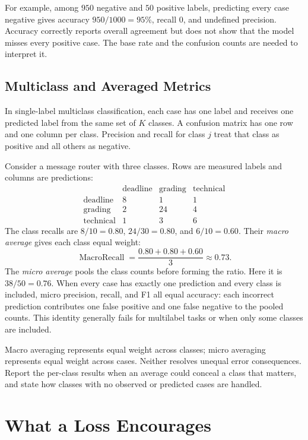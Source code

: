 For example, among $950$ negative and $50$ positive labels, predicting every case negative gives accuracy $950/1000=95\%$, recall $0$, and undefined precision. Accuracy correctly reports overall agreement but does not show that the model misses every positive case. The base rate and the confusion counts are needed to interpret it.

\subsection{Multiclass and Averaged Metrics}

In single-label multiclass classification, each case has one label and receives one predicted label from the same set of $K$ classes. A confusion matrix has one row and one column per class. Precision and recall for class $j$ treat that class as positive and all others as negative.

Consider a message router with three classes. Rows are measured labels and columns are predictions:
\[
\begin{array}{c|ccc}
 & \text{deadline} & \text{grading} & \text{technical}\\ \hline
\text{deadline} & 8 & 1 & 1\\
\text{grading} & 2 & 24 & 4\\
\text{technical} & 1 & 3 & 6
\end{array}
\]
The class recalls are $8/10=0.80$, $24/30=0.80$, and $6/10=0.60$. Their \emph{macro average} gives each class equal weight:
\[
\operatorname{MacroRecall}=\frac{0.80+0.80+0.60}{3}\approx0.73.
\]
The \emph{micro average} pools the class counts before forming the ratio. Here it is $38/50=0.76$. When every case has exactly one prediction and every class is included, micro precision, recall, and F1 all equal accuracy: each incorrect prediction contributes one false positive and one false negative to the pooled counts. This identity generally fails for multilabel tasks or when only some classes are included.

Macro averaging represents equal weight across classes; micro averaging represents equal weight across cases. Neither resolves unequal error consequences. Report the per-class results when an average could conceal a class that matters, and state how classes with no observed or predicted cases are handled.

\section{What a Loss Encourages}

